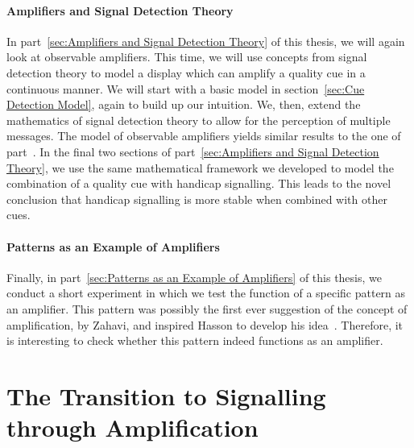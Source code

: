 \documentclass[a4paper,12pt]{article}
\numberwithin{equation}{section}
\begin{document}
\subsection{Amplifiers and Signal Detection Theory}
\label{Introduction/Amplifiers and Signal Detection Theory}

In part~\ref{sec:Amplifiers and Signal Detection Theory} of this thesis, we will again look at observable amplifiers. This time, we will use concepts from signal detection theory to model a display which can amplify a quality cue in a continuous manner. We will start with a basic model in section~\ref{sec:Cue Detection Model}, again to build up our intuition. We, then, extend the mathematics of signal detection theory to allow for the perception of multiple messages. The model of observable amplifiers yields similar results to the one of part~\ref{sec:The Transition to Signalling through Amplification}. In the final two sections of part~\ref{sec:Amplifiers and Signal Detection Theory}, we use the same mathematical framework we developed to model the combination of a quality cue with handicap signalling. This leads to the novel conclusion that handicap signalling is more stable when combined with other cues.


\subsection{Patterns as an Example of Amplifiers}
\label{sec:Introduction/Patterns as an Example of Amplifiers}

Finally, in part~\ref{sec:Patterns as an Example of Amplifiers} of this thesis, we conduct a short experiment in which we test the function of a specific pattern as an amplifier. This pattern was possibly the first ever suggestion of the concept of amplification, by Zahavi, and inspired Hasson to develop his idea~\cite{Zahavi1978}. Therefore, it is interesting to check whether this pattern indeed functions as an amplifier.

\newpage\clearpage


\part{The Transition to Signalling through Amplification}
\label{sec:The Transition to Signalling through Amplification}
\end{document}
